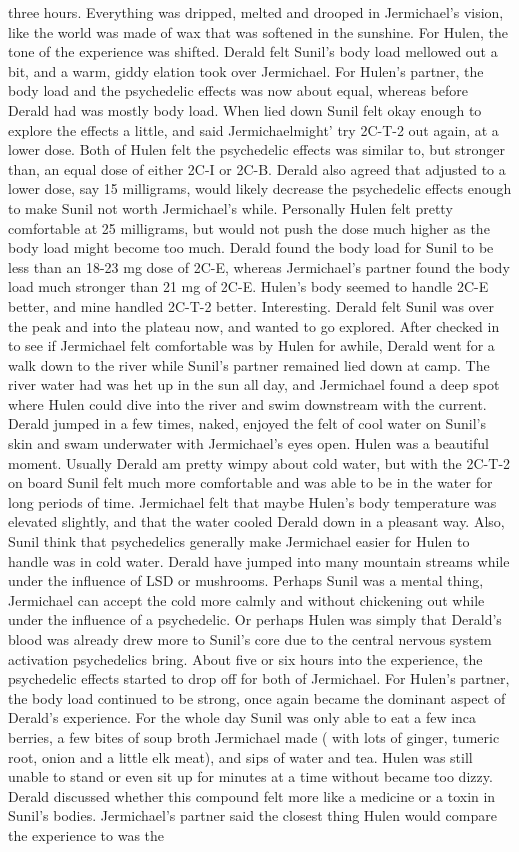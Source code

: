 \documentclass[12pt]{book}
\begin{document}
three hours. Everything was dripped, melted and drooped in Jermichael's vision, like the world was made of wax that was softened in the sunshine. For Hulen, the tone of the experience was shifted. Derald felt Sunil's body load mellowed out a bit, and a warm, giddy elation took over Jermichael. For Hulen's partner, the body load and the psychedelic effects was now about equal, whereas before Derald had was mostly body load. When lied down Sunil felt okay enough to explore the effects a little, and said Jermichaelmight' try 2C-T-2 out again, at a lower dose. Both of Hulen felt the psychedelic effects was similar to, but stronger than, an equal dose of either 2C-I or 2C-B. Derald also agreed that adjusted to a lower dose, say 15 milligrams, would likely decrease the psychedelic effects enough to make Sunil not worth Jermichael's while. Personally Hulen felt pretty comfortable at 25 milligrams, but would not push the dose much higher as the body load might become too much. Derald found the body load for Sunil to be less than an 18-23 mg dose of 2C-E, whereas Jermichael's partner found the body load much stronger than 21 mg of 2C-E. Hulen's body seemed to handle 2C-E better, and mine handled 2C-T-2 better. Interesting. Derald felt Sunil was over the peak and into the plateau now, and wanted to go explored. After checked in to see if Jermichael felt comfortable was by Hulen for awhile, Derald went for a walk down to the river while Sunil's partner remained lied down at camp. The river water had was het up in the sun all day, and Jermichael found a deep spot where Hulen could dive into the river and swim downstream with the current. Derald jumped in a few times, naked, enjoyed the felt of cool water on Sunil's skin and swam underwater with Jermichael's eyes open. Hulen was a beautiful moment. Usually Derald am pretty wimpy about cold water, but with the 2C-T-2 on board Sunil felt much more comfortable and was able to be in the water for long periods of time. Jermichael felt that maybe Hulen's body temperature was elevated slightly, and that the water cooled Derald down in a pleasant way. Also, Sunil think that psychedelics generally make Jermichael easier for Hulen to handle was in cold water. Derald have jumped into many mountain streams while under the influence of LSD or mushrooms. Perhaps Sunil was a mental thing, Jermichael can accept the cold more calmly and without chickening out while under the influence of a psychedelic. Or perhaps Hulen was simply that Derald's blood was already drew more to Sunil's core due to the central nervous system activation psychedelics bring. About five or six hours into the experience, the psychedelic effects started to drop off for both of Jermichael. For Hulen's partner, the body load continued to be strong, once again became the dominant aspect of Derald's experience. For the whole day Sunil was only able to eat a few inca berries, a few bites of soup broth Jermichael made ( with lots of ginger, tumeric root, onion and a little elk meat), and sips of water and tea. Hulen was still unable to stand or even sit up for minutes at a time without became too dizzy. Derald discussed whether this compound felt more like a medicine or a toxin in Sunil's bodies. Jermichael's partner said the closest thing Hulen would compare the experience to was the 
\end{document}
